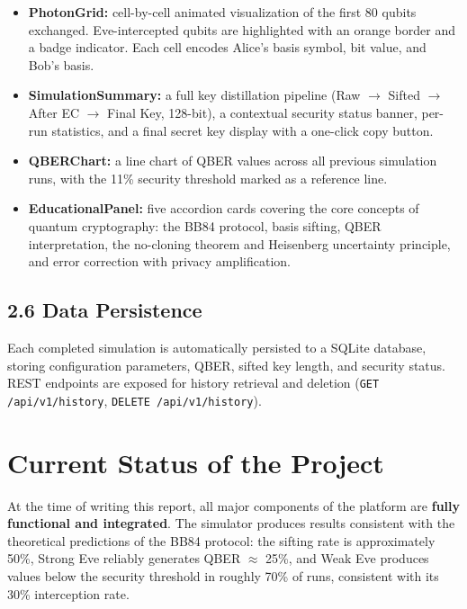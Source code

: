 \documentclass[12pt, a4paper]{article}
\begin{document}
\begin{itemize}
  \item \textbf{PhotonGrid:} cell-by-cell animated visualization of the
        first 80 qubits exchanged. Eve-intercepted qubits are highlighted
        with an orange border and a badge indicator. Each cell encodes
        Alice's basis symbol, bit value, and Bob's basis.
  \item \textbf{SimulationSummary:} a full key distillation pipeline
        (Raw $\to$ Sifted $\to$ After EC $\to$ Final Key, 128-bit),
        a contextual security status banner, per-run statistics, and
        a final secret key display with a one-click copy button.
  \item \textbf{QBERChart:} a line chart of QBER values across all
        previous simulation runs, with the 11\% security threshold
        marked as a reference line.
  \item \textbf{EducationalPanel:} five accordion cards covering the
        core concepts of quantum cryptography: the BB84 protocol, basis
        sifting, QBER interpretation, the no-cloning theorem and
        Heisenberg uncertainty principle, and error correction with
        privacy amplification.
\end{itemize}

\subsection{2.6 Data Persistence}

Each completed simulation is automatically persisted to a SQLite database,
storing configuration parameters, QBER, sifted key length, and security
status. REST endpoints are exposed for history retrieval and deletion
(\texttt{GET /api/v1/history}, \texttt{DELETE /api/v1/history}).

\section{Current Status of the Project}

At the time of writing this report, all major components of the platform
are \textbf{fully functional and integrated}. The simulator produces results
consistent with the theoretical predictions of the BB84 protocol: the sifting
rate is approximately 50\%, Strong Eve reliably generates QBER $\approx$ 25\%,
and Weak Eve produces values below the security threshold in roughly 70\% of
runs, consistent with its 30\% interception rate.
\end{document}
